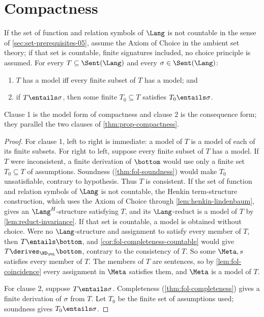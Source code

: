 \section{Compactness}
\label{sec:fol-metatheory-04}

\begin{theorem}
\label{thm:fol-compactness}
If the set of function and relation symbols of \(\Lang\) is not
countable in the sense of \cref{sec:set-prerequisites-05}, assume the
Axiom of Choice in the ambient set theory; if that set is countable,
finite signatures included, no choice principle is assumed.  For every
\(T\subseteq\Sent(\Lang)\) and every \(\sigma\in\Sent(\Lang)\):
\begin{enumerate}
  \item \(T\) has a model iff every finite subset of \(T\) has a model;
        and
  \item if \(T\entails\sigma\), then some finite \(T_0\subseteq T\)
        satisfies \(T_0\entails\sigma\).
\end{enumerate}
Clause 1 is the model form of compactness and clause 2 is the consequence
form; they parallel the two clauses of \cref{thm:prop-compactness}.
\end{theorem}
\begin{proof}
For clause 1, left to right is immediate: a model of \(T\) is a model of
each of its finite subsets.  For right to left, suppose every finite
subset of \(T\) has a model.  If \(T\) were inconsistent, a finite
derivation of \(\bottom\) would use only a finite set
\(T_0\subseteq T\) of assumptions.  Soundness (\cref{thm:fol-soundness})
would make \(T_0\) unsatisfiable, contrary to hypothesis.  Thus \(T\) is
consistent.  If the set of function and relation symbols of \(\Lang\)
is not countable, the Henkin term-structure construction, which uses the
Axiom of Choice through \cref{lem:henkin-lindenbaum}, gives an
\(\Lang^H\)-structure satisfying \(T\), and its \(\Lang\)-reduct is a
model of \(T\) by \cref{lem:reduct-invariance}.  If that set is
countable, a model is obtained without choice.  Were no
\(\Lang\)-structure and assignment to satisfy every member of \(T\), then
\(T\entails\bottom\), and \cref{cor:fol-completeness-countable} would
give \(T\derives_{\ND_{\FOL}}\bottom\), contrary to the consistency of
\(T\).  So some \(\Meta,s\) satisfies every member of \(T\).  The members
of \(T\) are sentences, so by \cref{lem:fol-coincidence} every assignment
in \(\Meta\) satisfies them, and \(\Meta\) is a model of \(T\).

For clause 2, suppose \(T\entails\sigma\).  Completeness
(\cref{thm:fol-completeness}) gives a finite derivation of \(\sigma\)
from \(T\).  Let \(T_0\) be the finite set of assumptions used; soundness
gives \(T_0\entails\sigma\).
\end{proof}

